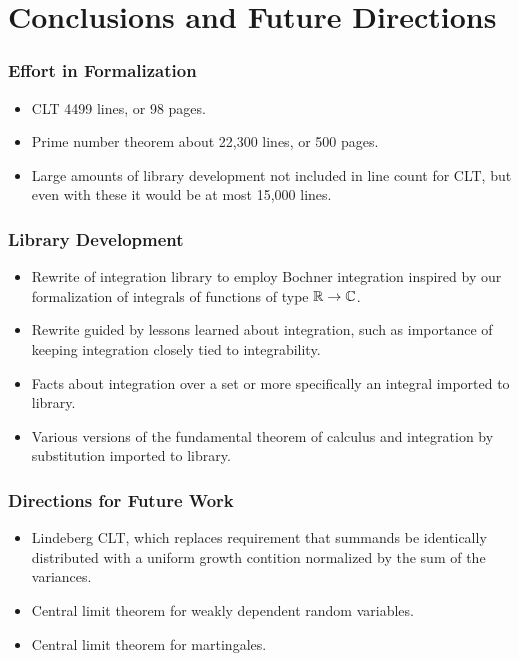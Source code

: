 \documentclass{beamer}
\begin{document}
\section{Conclusions and Future Directions}

\begin{frame}
\frametitle{Effort in Formalization}
\begin{itemize}
\item CLT 4499 lines, or 98 pages. \pause
\item Prime number theorem about 22,300 lines, or 500 pages. \pause
\item Large amounts of library development not included in line count for CLT, but even with these it would be at most 15,000 lines.
\end{itemize}
\end{frame}

\begin{frame}
\frametitle{Library Development}
\begin{itemize}
\item Rewrite of integration library to employ Bochner integration inspired by our formalization of integrals of functions of type $\mathbb{R} \rightarrow \mathbb{C}$. \pause
\item Rewrite guided by lessons learned about integration, such as importance of keeping integration closely tied to integrability. \pause
\item Facts about integration over a set or more specifically an integral imported to library. \pause
\item Various versions of the fundamental theorem of calculus and integration by substitution imported to library.
\end{itemize}
\end{frame}

\begin{frame}
\frametitle{Directions for Future Work}
\begin{itemize}
\item Lindeberg CLT, which replaces requirement that summands be identically distributed with a uniform growth contition normalized by the sum of the variances. \pause
\item Central limit theorem for weakly dependent random variables. \pause
\item Central limit theorem for martingales.
\end{itemize}
\end{frame}
\end{document}
